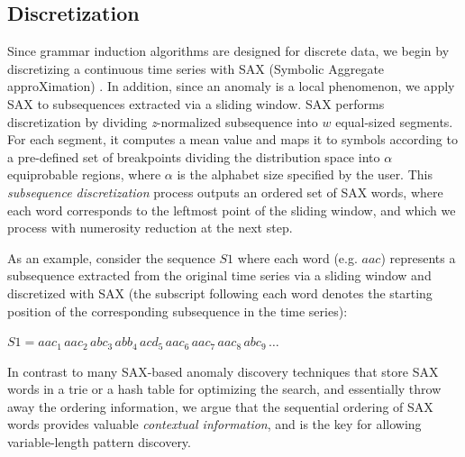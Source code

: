 \documentclass{sig-alternate}
\begin{document}
\subsection{Discretization} 
Since grammar induction algorithms are designed for discrete data, we begin by discretizing a continuous time series with SAX (Symbolic Aggregate approXimation) \cite{sax}. In addition, since an anomaly is a local phenomenon,  we apply SAX to subsequences extracted via a sliding window. SAX performs discretization by dividing \textit{z}-normalized subsequence into $w$ equal-sized segments. For each segment, it computes a mean value and maps it to symbols according to a pre-defined set of breakpoints dividing the distribution space into $\alpha$ equiprobable regions, where $\alpha$ is the alphabet size specified by the user. This \textit{subsequence discretization} process \cite{lin_motifs} outputs an ordered set of SAX words, where each word corresponds to the leftmost point of the sliding window, and which we process with numerosity reduction at the next step.

As an example, consider the sequence $S1$ where each word (e.g. $aac$) represents a subsequence extracted from the original time series via a sliding window and discretized with SAX (the subscript following each word denotes the starting position of the corresponding subsequence in the time series):

\begin{center} 
$S1= aac_{1}\, aac_{2}\, abc_{3}\, abb_{4}\, acd_{5}\, aac_{6}\, aac_{7}\, aac_{8}\, abc_{9}\, \dots$
\end{center}

In contrast to many SAX-based anomaly discovery techniques that store SAX words in a trie or a hash table for optimizing the search, and essentially throw away the ordering information, we argue that the sequential ordering of SAX words provides valuable \textit{contextual information}, and is the key for allowing variable-length pattern discovery. 
\end{document}
